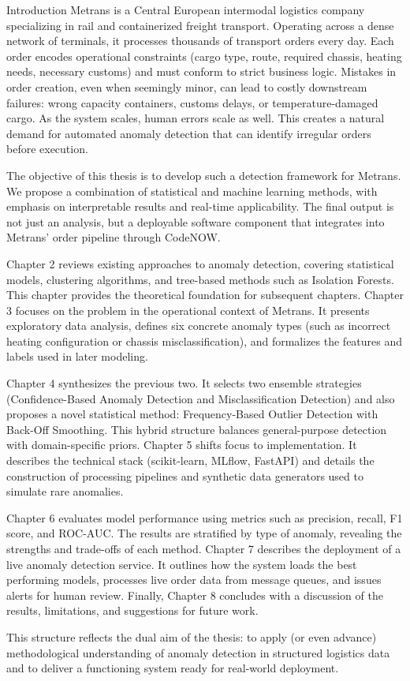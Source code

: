 \chap Introduction
Metrans is a Central European intermodal logistics company specializing in rail and containerized freight transport. Operating across a dense network of terminals, it processes thousands of transport orders every day. Each order encodes operational constraints (cargo type, route, required chassis, heating needs, necessary customs) and must conform to strict business logic. Mistakes in order creation, even when seemingly minor, can lead to costly downstream failures: wrong capacity containers, customs delays, or temperature-damaged cargo. As the system scales, human errors scale as well. This creates a natural demand for automated anomaly detection that can identify irregular orders before execution.

The objective of this thesis is to develop such a detection framework for Metrans. We propose a combination of statistical and machine learning methods, with emphasis on interpretable results and real-time applicability. The final output is not just an analysis, but a deployable software component that integrates into Metrans’ order pipeline through CodeNOW.

Chapter 2 reviews existing approaches to anomaly detection, covering statistical models, clustering algorithms, and tree-based methods such as Isolation Forests. This chapter provides the theoretical foundation for subsequent chapters. Chapter 3 focuses on the problem in the operational context of Metrans. It presents exploratory data analysis, defines six concrete anomaly types (such as incorrect heating configuration or chassis misclassification), and formalizes the features and labels used in later modeling.

Chapter 4 synthesizes the previous two. It selects two ensemble strategies (Confidence-Based Anomaly Detection and Misclassification Detection) and also proposes a novel statistical method: Frequency-Based Outlier Detection with Back-Off Smoothing. This hybrid structure balances general-purpose detection with domain-specific priors. Chapter 5 shifts focus to implementation. It describes the technical stack (scikit-learn, MLflow, FastAPI) and details the construction of processing pipelines and synthetic data generators used to simulate rare anomalies.

Chapter 6 evaluates model performance using metrics such as precision, recall, F1 score, and ROC-AUC. The results are stratified by type of anomaly, revealing the strengths and trade-offs of each method. Chapter 7 describes the deployment of a live anomaly detection service. It outlines how the system loads the best performing models, processes live order data from message queues, and issues alerts for human review. Finally, Chapter 8 concludes with a discussion of the results, limitations, and suggestions for future work.

This structure reflects the dual aim of the thesis: to apply (or even advance) methodological understanding of anomaly detection in structured logistics data and to deliver a functioning system ready for real-world deployment.

